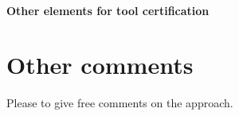 \paragraph{Other elements for tool certification}

\section{Other comments}
Please to  give free comments on the approach.



